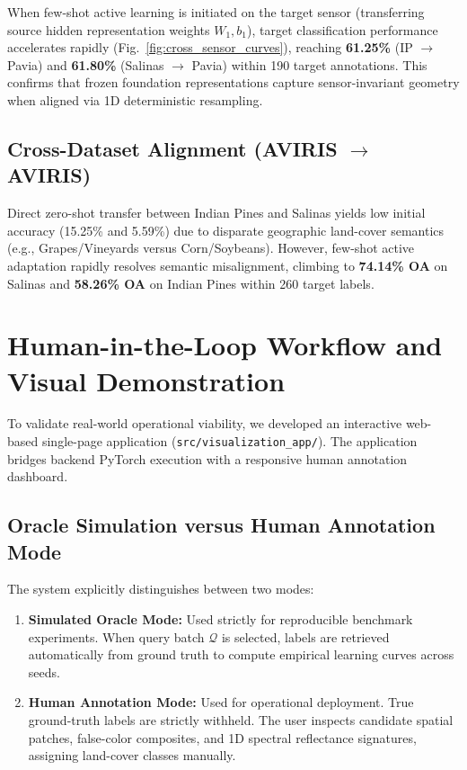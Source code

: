 \documentclass[conference,letterpaper]{IEEEtran}
\begin{document}
\vspace{0.3em}
When few-shot active learning is initiated on the target sensor (transferring source hidden representation weights $W_1, b_1$), target classification performance accelerates rapidly (Fig.~\ref{fig:cross_sensor_curves}), reaching \textbf{61.25\%} (IP $\to$ Pavia) and \textbf{61.80\%} (Salinas $\to$ Pavia) within 190 target annotations. This confirms that frozen foundation representations capture sensor-invariant geometry when aligned via 1D deterministic resampling.

\subsection{Cross-Dataset Alignment (AVIRIS $\to$ AVIRIS)}
Direct zero-shot transfer between Indian Pines and Salinas yields low initial accuracy (15.25\% and 5.59\%) due to disparate geographic land-cover semantics (e.g., Grapes/Vineyards versus Corn/Soybeans). However, few-shot active adaptation rapidly resolves semantic misalignment, climbing to \textbf{74.14\% OA} on Salinas and \textbf{58.26\% OA} on Indian Pines within 260 target labels.

\section{Human-in-the-Loop Workflow and Visual Demonstration}

To validate real-world operational viability, we developed an interactive web-based single-page application (\texttt{src/visualization\_app/}). The application bridges backend PyTorch execution with a responsive human annotation dashboard.

\subsection{Oracle Simulation versus Human Annotation Mode}
The system explicitly distinguishes between two modes:
\begin{enumerate}
    \item \textbf{Simulated Oracle Mode:} Used strictly for reproducible benchmark experiments. When query batch $\mathcal{Q}$ is selected, labels are retrieved automatically from ground truth to compute empirical learning curves across seeds.
    \item \textbf{Human Annotation Mode:} Used for operational deployment. True ground-truth labels are strictly withheld. The user inspects candidate spatial patches, false-color composites, and 1D spectral reflectance signatures, assigning land-cover classes manually.
\end{enumerate}
\end{document}
